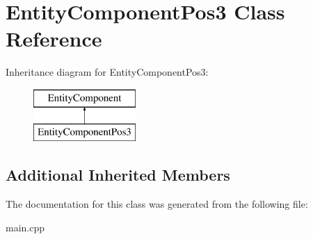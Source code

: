 \hypertarget{class_entity_component_pos3}{}\section{Entity\+Component\+Pos3 Class Reference}
\label{class_entity_component_pos3}
Inheritance diagram for Entity\+Component\+Pos3\+:\begin{figure}[H]
\begin{center}
\leavevmode
\includegraphics[height=2.000000cm]{class_entity_component_pos3}
\end{center}
\end{figure}
\subsection*{Additional Inherited Members}


The documentation for this class was generated from the following file\+:\begin{DoxyCompactItemize}
\item 
main.\+cpp\end{DoxyCompactItemize}
